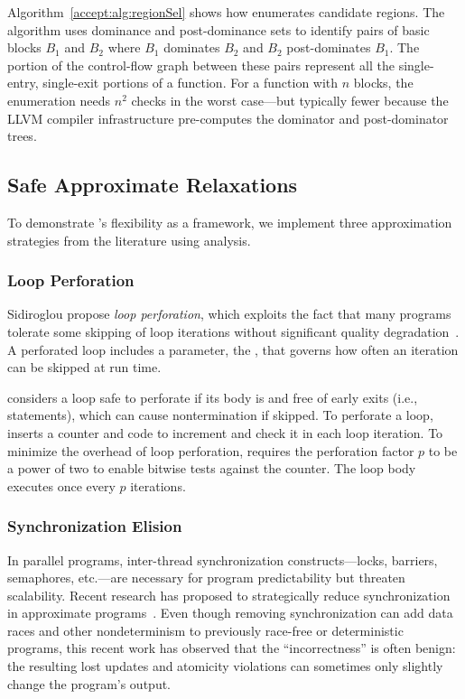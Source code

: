 Algorithm~\ref{accept:alg:regionSel} shows how \sysname enumerates candidate regions.
The algorithm uses dominance and post-dominance sets to
identify pairs of basic blocks $B_1$ and $B_2$
where $B_1$ dominates $B_2$ and $B_2$ post-dominates $B_1$.
The portion of the control-flow graph between these pairs represent all the
single-entry, single-exit portions of a function.
For a function with $n$ blocks, the enumeration needs $n^2$ \precisepurity
checks in the worst case---but typically fewer because the LLVM compiler
infrastructure pre-computes the dominator and post-dominator trees.


\subsection{Safe Approximate Relaxations}

To demonstrate \sysname's flexibility as a framework, we implement three
approximation strategies from the literature using \precisepurity analysis.

\subsubsection{Loop Perforation}
Sidiroglou \etal propose \emph{loop perforation},
which exploits the fact that many programs tolerate some skipping of loop
iterations without significant quality degradation~\cite{perforation}.
A perforated loop includes a parameter, the , that
governs how often an iteration can be skipped at run time.

\sysname considers a loop safe to perforate if its body is
\precisepure and free of early exits (i.e., 
statements), which can cause nontermination if skipped.
To perforate a loop, \sysname inserts a counter and code to increment and
check it in each loop iteration.
To minimize the overhead of loop perforation, \sysname
requires the perforation factor $p$ to be a power of two to enable bitwise tests
against the counter.  The loop body executes once every $p$ iterations.

\subsubsection{Synchronization Elision}
In parallel programs, inter-thread synchronization constructs---locks,
barriers, semaphores, etc.---are necessary for program predictability but
threaten scalability.
Recent research has proposed
to strategically reduce
synchronization in approximate programs~\cite{rinard-hotpar, quickstep, dubstep, races-ibm}.
Even though removing synchronization can add data races and other
nondeterminism to previously race-free or deterministic programs, this recent
work has observed that the ``incorrectness'' is often benign:
the resulting lost updates and atomicity violations can
sometimes only slightly change the program's output.

